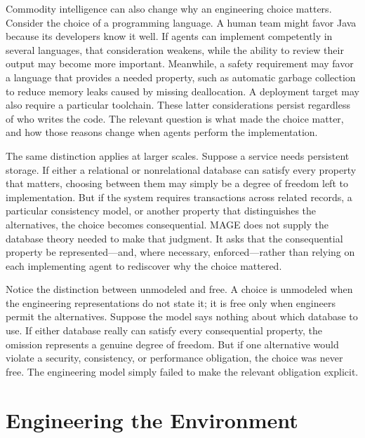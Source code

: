 Commodity intelligence can also change why an engineering choice matters. Consider the choice of a programming language. A human team might favor Java because its developers know it well. If agents can implement competently in several languages, that consideration weakens, while the ability to review their output may become more important. Meanwhile, a safety requirement may favor a language that provides a needed property, such as automatic garbage collection to reduce memory leaks caused by missing deallocation. A deployment target may also require a particular toolchain. These latter considerations persist regardless of who writes the code. The relevant question is what made the choice matter, and how those reasons change when agents perform the implementation.

The same distinction applies at larger scales. Suppose a service needs persistent storage. If either a relational or nonrelational database can satisfy every property that matters, choosing between them may simply be a degree of freedom left to implementation. But if the system requires transactions across related records, a particular consistency model, or another property that distinguishes the alternatives, the choice becomes consequential. MAGE does not supply the database theory needed to make that judgment. It asks that the consequential property be represented---and, where necessary, enforced---rather than relying on each implementing agent to rediscover why the choice mattered.

Notice the distinction between unmodeled and free. A choice is unmodeled when the engineering representations do not state it; it is free only when engineers permit the alternatives. Suppose the model says nothing about which database to use. If either database really can satisfy every consequential property, the omission represents a genuine degree of freedom. But if one alternative would violate a security, consistency, or performance obligation, the choice was never free. The engineering model simply failed to make the relevant obligation explicit.

\section{Engineering the Environment}\label{heading:engineering-the-environment}


